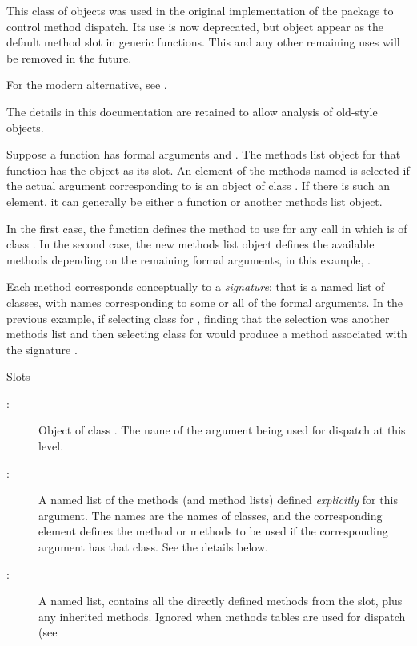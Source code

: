 %
\begin{Description}\relax
 This class of objects was used in the original
implementation of the package to control method dispatch.  Its use
is now deprecated, but object appear as the default method slot in
generic functions.  This and any other remaining uses will be
removed in the future.

For the modern alternative, see .

The details in this documentation are retained to allow analysis of
old-style objects. 
\end{Description}
%
\begin{Details}\relax
Suppose a function  has
formal arguments  and .  The methods list object for
that function has the object  as its
 slot.  An element of the methods named 
is selected if the actual argument corresponding to  is an
object of class .  If there is such an element, it can
generally be either a function or another methods list object.

In the first case, the function defines the method to use for any call
in which  is of class .  In the second case, the
new methods list object defines the available methods depending on
the remaining formal arguments, in this example, . 

Each method  corresponds conceptually to a \emph{signature};
that is a named list of classes, with names corresponding to some or
all of the formal arguments.  In the previous example, if selecting
class  for , finding that the selection was
another methods list and then selecting class  for
 would produce a method associated with the signature
.

\end{Details}
%
\begin{Section}{Slots}
\begin{description}


\item[:] Object of class .  The name of the
argument being used for dispatch at this level. 
\item[:] A named list of the methods (and method lists)
defined \emph{explicitly} for this argument. 
The names are the names of classes, and the corresponding
element defines the method or methods to be used if the corresponding
argument has that class.  See the details below.
\item[:] A named list,  contains
all the directly defined methods from the  slot, plus
any inherited methods.  Ignored when methods tables are used for dispatch (see  

\end{description}
\end{Section}
